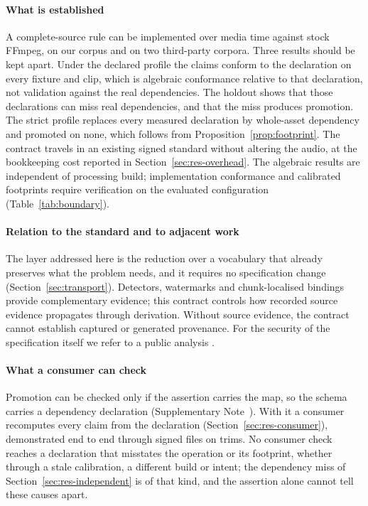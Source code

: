 \documentclass[preprint,3p,11pt,authoryear]{elsarticle}
\begin{document}
\paragraph{What is established} A complete-source rule can be implemented over
media time against stock FFmpeg, on our corpus and on two third-party corpora.
Three results should be kept apart. Under the declared profile the claims conform
to the declaration on every fixture and clip, which is algebraic conformance
relative to that declaration, not validation against the real dependencies. The
holdout shows that those declarations can miss real dependencies, and that the
miss produces promotion. The strict profile replaces every measured declaration
by whole-asset dependency and promoted on none, which follows from
Proposition~\ref{prop:footprint}. The contract travels in an existing signed
standard without altering the audio, at the bookkeeping cost reported in
Section~\ref{sec:res-overhead}. The algebraic results
are independent of processing build; implementation conformance and calibrated
footprints require verification on the evaluated configuration
(Table~\ref{tab:boundary}).

\paragraph{Relation to the standard and to adjacent work} The layer addressed
here is the reduction over a vocabulary that already preserves what the problem
needs, and it requires no specification change
(Section~\ref{sec:transport}). Detectors, watermarks and chunk-localised
bindings \citep{ono2026merklespeech} provide complementary evidence; this
contract controls how recorded source evidence propagates through derivation.
Without source evidence, the contract cannot establish captured or generated
provenance. For the security of the specification itself we refer to a public
analysis \citep{golaszewski2026c2pa}.

\paragraph{What a consumer can check} Promotion can be checked only if the
assertion carries the map, so the schema carries a dependency declaration
(Supplementary Note~\NoteSchema{}). With it a consumer
recomputes every claim from the declaration (Section~\ref{sec:res-consumer}),
demonstrated end to end through signed files on \PtwoClips{} trims. No
consumer check reaches a declaration that misstates the operation or its
footprint, whether through a stale calibration, a different build or intent; the
dependency miss of Section~\ref{sec:res-independent} is of that kind, and the
assertion alone cannot tell these causes apart.
\end{document}
